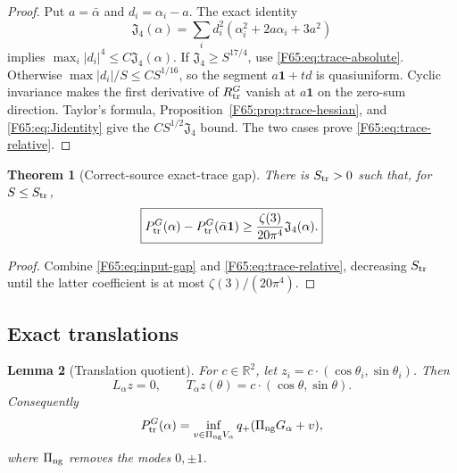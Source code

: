 \documentclass[11pt]{amsart}
\numberwithin{equation}{section}
\newtheorem{theorem}{Theorem}[section]
\newtheorem{lemma}[theorem]{Lemma}
\theoremstyle{definition}
\theoremstyle{remark}
\newcommand{\R}{\mathbb R}
\newcommand{\PiNG}{\Pi_{\rm ng}}
\newcommand{\Jfour}{\mathfrak J_4}
\newcommand{\qplus}{q_+}
\begin{document}
\begin{proof}
Put $a=\bar\alpha$ and $d_i=\alpha_i-a$.  The exact identity
\begin{equation}\label{F65:eq:Jidentity}
 \Jfour(\alpha)
 =\sum_i d_i^2(\alpha_i^2+2a\alpha_i+3a^2)
\end{equation}
implies $\max_i|d_i|^4\le C\Jfour(\alpha)$.
If $\Jfour\ge S^{17/4}$, use \eqref{F65:eq:trace-absolute}.  Otherwise
$\max|d_i|/S\le CS^{1/16}$, so the segment
$a\mathbf1+td$ is quasiuniform.  Cyclic invariance makes the first
derivative of $R_{\rm tr}^G$ vanish at $a\mathbf1$ on the zero-sum
direction.  Taylor's formula, Proposition~\ref{F65:prop:trace-hessian}, and
\eqref{F65:eq:Jidentity} give the $CS^{1/2}\Jfour$ bound.  The two cases prove
\eqref{F65:eq:trace-relative}.
\end{proof}

\begin{theorem}[Correct-source exact-trace gap]\label{F65:thm:trace-gap}
There is $S_{\rm tr}>0$ such that, for $S\le S_{\rm tr}$,
\begin{equation}\label{F65:eq:trace-gap}
 \boxed{
 P_{\rm tr}^G(\alpha)-P_{\rm tr}^G(\bar\alpha\mathbf1)
 \ge\frac{\zeta(3)}{20\pi^4}\Jfour(\alpha).}
\end{equation}
\end{theorem}

\begin{proof}
Combine \eqref{F65:eq:input-gap} and \eqref{F65:eq:trace-relative}, decreasing
$S_{\rm tr}$ until the latter coefficient is at most
$\zeta(3)/(20\pi^4)$.
\end{proof}

\subsection{Exact translations}\label{F65:sec:translations}

\begin{lemma}[Translation quotient]\label{F65:lem:translations}
For $c\in\R^2$, let $z_i=c\cdot(\cos\theta_i,\sin\theta_i)$.  Then
\begin{equation}\label{F65:eq:translation}
 L_\alpha z=0,
 \qquad T_\alpha z(\theta)=c\cdot(\cos\theta,\sin\theta).
\end{equation}
Consequently
\begin{equation}\label{F65:eq:translation-quotient}
 P_{\rm tr}^G(\alpha)
 =\inf_{v\in\PiNG V_\alpha}
 \qplus(\PiNG G_\alpha+v),
\end{equation}
where $\PiNG$ removes the modes $0,\pm1$.
\end{lemma}
\end{document}
